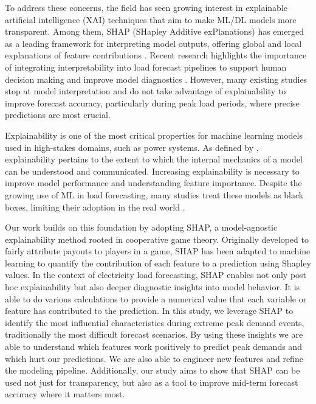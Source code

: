 \documentclass{ifacconf}
\begin{document}
To address these concerns, the field has seen growing interest in explainable artificial intelligence (XAI) techniques that aim to make ML/DL models more transparent. Among them, SHAP (SHapley Additive exPlanations) has emerged as a leading framework for interpreting model outputs, offering global and local explanations of feature contributions \cite{baur2024explainability, neubauer2025explainableb}. Recent research highlights the importance of integrating interpretability into load forecast pipelines to support human decision making and improve model diagnostics \cite{neubauer2025explainableb, baur2024explainability}. However, many existing studies stop at model interpretation and do not take advantage of explainability to improve forecast accuracy, particularly during peak load periods, where precise predictions are most crucial.

Explainability is one of the most critical properties for machine learning models used in high-stakes domains, such as power systems. As defined by  \cite{baur2024explainability}, explainability pertains to the extent to which the internal mechanics of a model can be understood and communicated. Increasing explainability is necessary to improve model performance and understanding feature importance. Despite the growing use of ML in load forecasting, many studies treat these models as black boxes, limiting their adoption in the real world \cite{baur2024explainability}.

Our work builds on this foundation by adopting SHAP, a model-agnostic explainability method rooted in cooperative game theory. Originally developed to fairly attribute payouts to players in a game, SHAP has been adapted to machine learning to quantify the contribution of each feature to a prediction using Shapley values. In the context of electricity load forecasting, SHAP enables not only post hoc explainability but also deeper diagnostic insights into model behavior. It is able to do various calculations to provide a numerical value that each variable or feature has contributed to the prediction. In this study, we leverage SHAP to identify the most influential characteristics during extreme peak demand events, traditionally the most difficult forecast scenarios. By using these insights we are able to understand which features work positively to predict peak demands and which hurt our predictions. We are also able to engineer new features and refine the modeling pipeline. Additionally, our study aims to show that SHAP can be used not just for transparency, but also as a tool to improve mid-term forecast accuracy where it matters most.
\end{document}
